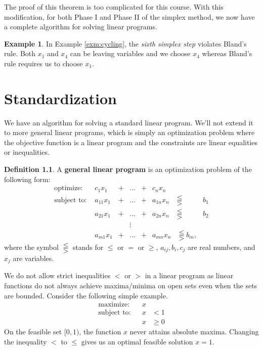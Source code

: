 \documentclass[
]{book}
\theoremstyle{definition}
\newtheorem{definition}{Definition}[chapter]
\theoremstyle{definition}
\newtheorem{example}{Example}[chapter]
\theoremstyle{definition}
\theoremstyle{definition}
\theoremstyle{remark}
\begin{document}
The proof of this theorem is too complicated for this course. With this modification, for both Phase I and Phase II of the simplex method, we now have a complete algorithm for solving linear programs.

\begin{example}
In Example \ref{exm:cycling}, the \emph{sixth simplex step} violates Bland's rule. Both \(x_1\) and \(x_4\) can be leaving variables and we choose \(x_4\) whereas Bland's rule requires us to choose \(x_1\).
\end{example}

\hypertarget{standardization}{%
\chapter{Standardization}\label{standardization}}

We have an algorithm for solving a standard linear program.
We'll not extend it to more general linear programs, which is simply an optimization problem where the objective function is a linear program and the constraints are linear equalities or inequalities.

\begin{definition}
A \textbf{general linear program} is an optimization problem of the following form:
\begin{equation}
  \begin{array}{llllllll}
    \mbox{optimize: } 
      & c_1 x_1 & + & \dots & + & c_n x_n & \\
    \mbox{subject to: } 
      & a_{11} x_1 & + & \dots & + & a_{1n} x_n & \lesseqqgtr & b_1 \\
      & a_{21} x_1 & + & \dots & + & a_{2n} x_n & \lesseqqgtr & b_2 \\
      & & & \vdots &  \\
      & a_{m1} x_1 & + & \dots & + & a_{mn} x_n & \lesseqqgtr b_m,
  \end{array}
  \label{eq:intro-lp}
\end{equation}
where the symbol \(\lesseqqgtr\) stands for \(\leq\) or \(=\) or \(\geq\), \(a_{ij}, b_i, c_j\) are real numbers, and \(x_j\) are variables.
\end{definition}

We do not allow strict inequalities \(<\) or \(>\) in a linear program as linear functions do not always achieve maxima/minima on open sets even when the sets are bounded. Consider the following simple example.
\begin{align*}
  \mbox{maximize:} && x \\
  \mbox{subject to:} 
  && x &< 1 \\
  && x &\ge 0
\end{align*}
On the feasible set \([0, 1)\), the function \(x\) never attains absolute maxima.
Changing the inequality \(<\) to \(\leq\) gives us an optimal feasible solution \(x = 1\).
\end{document}
